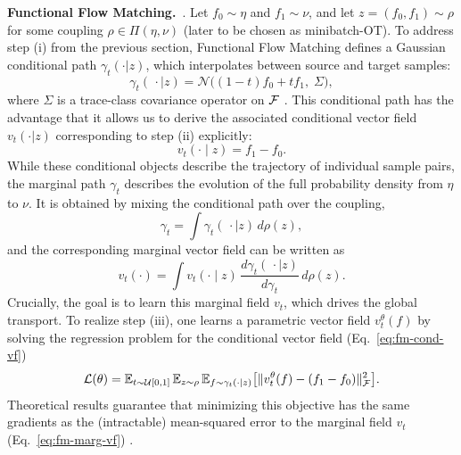 \textbf{Functional Flow Matching.}~\citep{kerrigan2023functional}. 
%
Let $f_0\sim\eta$ and $f_1\sim\nu$, and let $z=(f_0,f_1)\sim\rho$ for some coupling $\rho\in\Pi(\eta,\nu)$ (later to be chosen as minibatch-OT). 
%
To address step (i) from the previous section, Functional Flow Matching defines a Gaussian conditional path $\gamma_t(\cdot| z)$, which interpolates between source and target samples: \begin{equation}
\gamma_t(\,\cdot \mid z) = \mathcal{N}\!\bigl((1-t) f_0 + t f_1,\; \Sigma\bigr), 
\label{eq:fm-cond-path}
\end{equation}
where $\Sigma$ is a trace-class covariance operator on $\mathcal{F}$ \citep{da2014stochastic}.
%
This conditional path has the advantage that it allows us to derive the associated conditional vector field $v_t(\cdot| z)$ corresponding to step (ii) explicitly:
\begin{equation}
v_t(\cdot \mid z) = f_1 - f_0.
\label{eq:fm-cond-vf}
\end{equation}
%
While these conditional objects describe the trajectory of individual sample pairs, the marginal path $\gamma_t$ describes the evolution of the full probability density from $\eta$ to $\nu$. It is obtained by mixing the conditional path over the coupling,
\begin{equation}
\gamma_t =\int \gamma_t(\,\cdot \mid z)\, d\rho(z),
\label{eq:fm-marg-path}
\end{equation}
and the corresponding marginal vector field can be written as
\begin{equation}
v_t(\cdot)
=
\int v_t(\cdot \mid z)\,
\frac{d\gamma_t(\,\cdot \mid z)}{d\gamma_t}\,
d\rho(z).
\label{eq:fm-marg-vf}
\end{equation}
Crucially, the goal is to learn this marginal field $v_t$, which drives the global transport.
To realize step (iii), one learns a parametric vector field $v^\theta_t(f)$ by solving the regression problem for the conditional vector field (Eq.~\ref{eq:fm-cond-vf})
\begin{equation*}
\mathcal{L}(\theta)=\mathbb{E}_{t\sim\mathcal{U}[0,1]}\,
\mathbb{E}_{z\sim\rho}\,
\mathbb{E}_{f\sim\gamma_t(\cdot\mid z)}
\bigl[\|v^\theta_t(f)- (f_1-f_0)\|_{\mathcal{F}}^2\bigr].
\label{eq:fm-loss}
\end{equation*}
Theoretical results guarantee that minimizing this objective has the same gradients as the (intractable) mean-squared error to the marginal field
 $v_t$ (Eq.~\ref{eq:fm-marg-vf}) \citep{tong2023improving}. 
%


